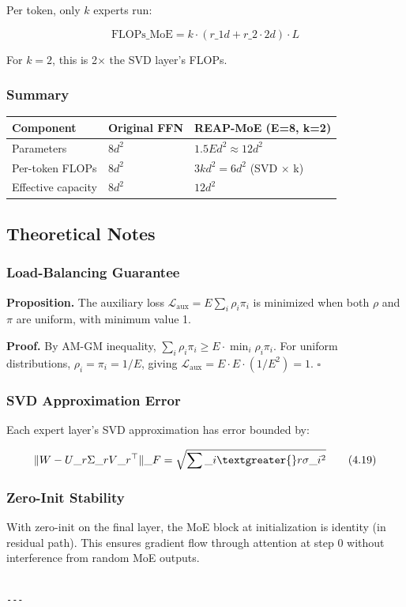Per token, only $k$ experts run:

\[
\text{FLOPs}\_\text{MoE} = k \cdot (r\_1 d + r\_2 \cdot 2d) \cdot L
\tag{4.18}
\]

For $k = 2$, this is 2$\times$ the SVD layer's FLOPs.

\subsubsection{Summary}

\begin{table}[H]
\centering
\small
\begin{tabular}{lll}
\toprule
\textbf{Component} & \textbf{Original FFN} & \textbf{REAP-MoE (E=8, k=2)} \\
\midrule
Parameters & $8d^2$ & $1.5 E d^2 \approx 12d^2$ \\
Per-token FLOPs & $8d^2$ & $3 k d^2 = 6d^2$ (SVD $\times$ k) \\
Effective capacity & $8d^2$ & $12d^2$ \\
\bottomrule
\end{tabular}
\end{table}

\subsection{Theoretical Notes}

\subsubsection{Load-Balancing Guarantee}

\textbf{Proposition.} The auxiliary loss $\mathcal{L}_\text{aux} = E \sum_i \rho_i \pi_i$ 
is minimized when both $\rho$ and $\pi$ are uniform, with minimum value 1.

\textbf{Proof.} By AM-GM inequality, $\sum_i \rho_i \pi_i \geq E \cdot \min_i \rho_i \pi_i$. 
For uniform distributions, $\rho_i = \pi_i = 1/E$, giving $\mathcal{L}_\text{aux} = E \cdot E \cdot (1/E^2) = 1$. $\square$

\subsubsection{SVD Approximation Error}

Each expert layer's SVD approximation has error bounded by:

\[
\|W - U\_r \Sigma\_r V\_r^\top\|\_F = \sqrt{\sum\_{i \textgreater{} r} \sigma\_i^2}
\tag{4.19}
\]

\subsubsection{Zero-Init Stability}

With zero-init on the final layer, the MoE block at initialization is 
identity (in residual path). This ensures gradient flow through attention 
at step 0 without interference from random MoE outputs.
\begin{lstlisting}

---
\end{lstlisting}